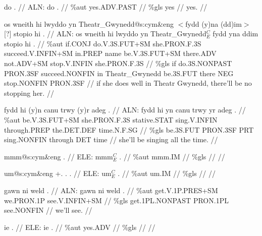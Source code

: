 \documentclass[a4paper,10pt]{article}
\begin{document}
\ex
\begingl[lingstyle=gergl]
\glchat do . //
\glsurface ALN:  do .  //
\glauto \%aut  yes{\scriptsize .ADV.PAST}   //
\glmanual \%gls  yes   //
\gleng yes. //
\endgl
\xe

\ex
\begingl[lingstyle=gergl]
\glchat os wneith hi lwyddo yn Theatr\_Gwynedd@s:cym\&eng $<$fydd (y)na (dd)im$>$ [?] stopio hi . //
\glsurface ALN:  os wneith hi lwyddo yn Theatr\_Gwynedd$^{C}_{E}$ fydd yna ddim stopio hi .  //
\glauto \%aut  if{\scriptsize .CONJ} do{\scriptsize .V.3S.FUT+SM} she{\scriptsize .PRON.F.3S} succeed{\scriptsize .V.INFIN+SM} in{\scriptsize .PREP} name be{\scriptsize .V.3S.FUT+SM} there{\scriptsize .ADV} not{\scriptsize .ADV+SM} stop{\scriptsize .V.INFIN} she{\scriptsize .PRON.F.3S}   //
\glmanual \%gls  if do{\scriptsize .3S.NONPAST} PRON{\scriptsize .3SF} succeed{\scriptsize .NONFIN} in Theatr\_Gwynedd be{\scriptsize .3S.FUT} there NEG stop{\scriptsize .NONFIN} PRON{\scriptsize .3SF}   //
\gleng if she does well in Theatr Gwynedd, there'll be no stopping her. //
\endgl
\xe

\ex
\begingl[lingstyle=gergl]
\glchat fydd hi (y)n canu trwy (y)r adeg . //
\glsurface ALN:  fydd hi yn canu trwy yr adeg .  //
\glauto \%aut  be{\scriptsize .V.3S.FUT+SM} she{\scriptsize .PRON.F.3S} stative{\scriptsize .STAT} sing{\scriptsize .V.INFIN} through{\scriptsize .PREP} the{\scriptsize .DET.DEF} time{\scriptsize .N.F.SG}   //
\glmanual \%gls  be{\scriptsize .3S.FUT} PRON{\scriptsize .3SF} PRT sing{\scriptsize .NONFIN} through DET time   //
\gleng she'll be singing all the time. //
\endgl
\xe

\ex
\begingl[lingstyle=gergl]
\glchat mmm@s:cym\&eng . //
\glsurface ELE:  mmm$^{C}_{E}$ .  //
\glauto \%aut  mmm{\scriptsize .IM}   //
\glmanual \%gls     //
\gleng  //
\endgl
\xe

\ex
\begingl[lingstyle=gergl]
\glchat um@s:cym\&eng +. . . //
\glsurface ELE:  um$^{C}_{E}$ .  //
\glauto \%aut  um{\scriptsize .IM}   //
\glmanual \%gls     //
\gleng  //
\endgl
\xe

\ex
\begingl[lingstyle=gergl]
\glchat gawn ni weld . //
\glsurface ALN:  gawn ni weld .  //
\glauto \%aut  get{\scriptsize .V.1P.PRES+SM} we{\scriptsize .PRON.1P} see{\scriptsize .V.INFIN+SM}   //
\glmanual \%gls  get{\scriptsize .1PL.NONPAST} PRON{\scriptsize .1PL} see{\scriptsize .NONFIN}   //
\gleng we'll see. //
\endgl
\xe

\ex
\begingl[lingstyle=gergl]
\glchat ie . //
\glsurface ELE:  ie .  //
\glauto \%aut  yes{\scriptsize .ADV}   //
\glmanual \%gls     //
\gleng  //
\endgl
\xe
\end{document}

